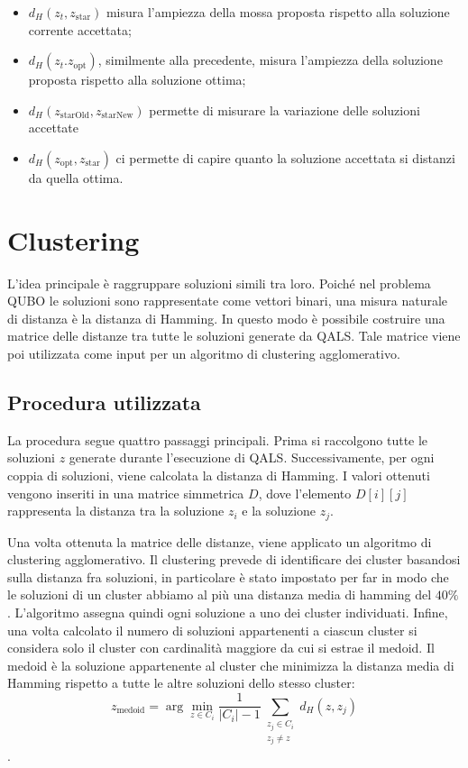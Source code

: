 \documentclass[a4paper,12pt]{article}
\begin{document}
\begin{itemize}
    \item \(d_H(z_t, z_{\text{star}})\) misura l'ampiezza della mossa proposta rispetto alla soluzione corrente accettata;
    \item \(d_H(z_t. z_{\text{opt}})\), similmente alla precedente, misura l'ampiezza della soluzione proposta rispetto alla soluzione ottima;
    \item \(d_H(z_{\text{starOld}}, z_{\text{starNew}})\) permette di misurare la variazione delle soluzioni accettate
    \item \(d_H(z_{\text{opt}}, z_{\text{star}})\) ci permette di capire quanto la soluzione accettata si distanzi da quella ottima.
\end{itemize}

\section{Clustering}

L'idea principale è raggruppare soluzioni simili tra loro. Poiché nel problema QUBO le soluzioni sono rappresentate come vettori binari, una misura naturale di distanza è la 
distanza di Hamming. In questo modo è possibile costruire una matrice delle distanze tra tutte le soluzioni generate da QALS. Tale matrice viene poi utilizzata come input per 
un algoritmo di clustering agglomerativo.

\subsection{Procedura utilizzata}

La procedura segue quattro passaggi principali.
Prima si raccolgono tutte le soluzioni $z$ generate durante l'esecuzione di QALS. Successivamente, per ogni coppia di soluzioni, viene calcolata la distanza di Hamming. 
I valori ottenuti vengono inseriti in una matrice simmetrica $D$, dove l'elemento $D[i][j]$ rappresenta la distanza tra la soluzione $z_i$ e la soluzione $z_j$.

Una volta ottenuta la matrice delle distanze, viene applicato un algoritmo di clustering agglomerativo. Il clustering prevede di identificare dei cluster basandosi 
sulla distanza fra soluzioni, in particolare è stato impostato per far in modo che le soluzioni di un cluster abbiamo al più una distanza media di hamming del \(40\%\). 
L'algoritmo assegna quindi ogni soluzione a uno dei cluster individuati. 
Infine, una volta calcolato il numero di soluzioni appartenenti a ciascun cluster si considera solo il cluster con cardinalità maggiore da cui 
si estrae il medoid. Il medoid è la soluzione appartenente al cluster che minimizza la distanza media di Hamming rispetto a tutte le 
altre soluzioni dello stesso cluster:
\[
z_{\text{medoid}}
=
\arg\min_{z \in C_i}
\frac{1}{|C_i|-1}
\sum_{\substack{z_j \in C_i \\ z_j \neq z}}
d_H(z, z_j)
\].
\end{document}
